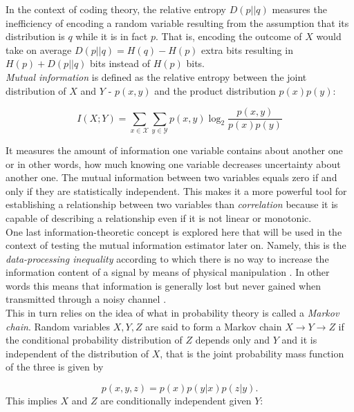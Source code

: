 \documentclass[12pt]{extarticle}
\begin{document}
\noindent
In the context of coding theory, the relative entropy $D(p||q)$
measures the inefficiency of encoding a random variable resulting from
the assumption that its distribution is $q$ while it is in fact
$p$. That is, encoding the outcome of $X$ would take on average
$D(p||q)=H(q)-H(p)$ extra bits resulting in $H(p)+D(p||q)$ bits
instead of $H(p)$ bits.\\

\noindent
\textit{Mutual information} is defined as the relative entropy between
the joint distribution of $X$ and $Y$ - $p(x,y)$ and the product
distribution $p(x)p(y)$:

\begin{equation}
I(X;Y)=\sum_{x\in\mathcal{X}}\sum_{y\in\mathcal{Y}}p(x,y)\log_2\frac{p(x,y)}{p(x)p(y)}
\end{equation}

\noindent
It measures the amount of information one variable contains about
another one or in other words, how much knowing one variable decreases
uncertainty about another one. The mutual information between two
variables equals zero if and only if they are statistically
independent. This makes it a more powerful tool for establishing a
relationship between two variables than \textit{correlation} because
it is capable of describing a relationship even if it is not linear or
monotonic.\\

\noindent 
One last information-theoretic concept is explored here that will be
used in the context of testing the mutual information estimator later
on. Namely, this is the \textit{data-processing inequality}
according to which there is no way to increase the information content
of a signal by means of physical manipulation \cite{Thomas}. In other
words this means that information is generally lost but never gained
when transmitted through a noisy channel \cite{Kinney-Atwal}.\\

\noindent
This in turn relies on the idea of what in probability theory is
called a \textit{Markov chain}. Random variables $X,Y,Z$ are said to
form a Markov chain $X \rightarrow Y \rightarrow Z$ if the conditional
probability distribution of $Z$ depends only and $Y$ and it is
independent of the distribution of $X$, that is  
the joint probability mass function of the three is given by

\begin{equation}
p(x, y, z) = p(x)p(y|x)p(z|y).
\end{equation}
This implies $X$ and $Z$ are conditionally independent given $Y$:
\end{document}
